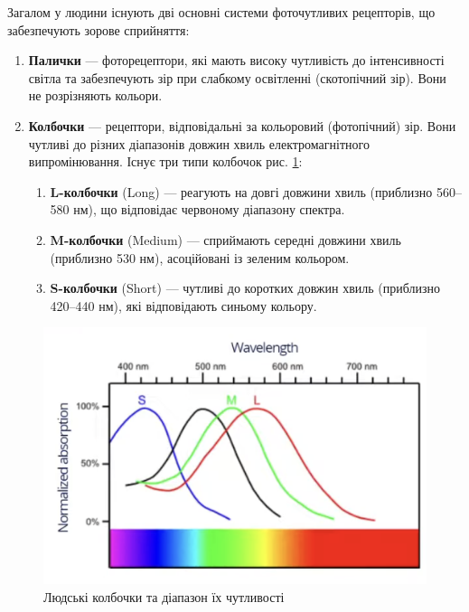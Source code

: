 \par
Загалом у людини існують дві основні системи фоточутливих рецепторів, що забезпечують зорове сприйняття:
\begin{enumerate}
\item \textbf{Палички} — фоторецептори, які мають високу чутливість до інтенсивності світла та забезпечують зір при слабкому освітленні 
(скотопічний зір). Вони не розрізняють кольори.
\item \textbf{Колбочки} — рецептори, відповідальні за кольоровий (фотопічний) зір. Вони чутливі до різних діапазонів довжин хвиль електромагнітного 
випромінювання. Існує три типи колбочок рис. \ref{fig:LightRecept}:
\begin{enumerate}
    \item \textbf{L-колбочки} (Long) — реагують на довгі довжини хвиль (приблизно 560–580 нм), що відповідає червоному діапазону спектра.
    \item \textbf{M-колбочки} (Medium) — сприймають середні довжини хвиль (приблизно 530 нм), асоційовані із зеленим кольором.
    \item \textbf{S-колбочки} (Short) — чутливі до коротких довжин хвиль (приблизно 420–440 нм), які відповідають синьому кольору.
\end{enumerate}
\end{enumerate}

 \begin{figure}[h]
  \centering
  \includegraphics[scale=1]{Pictures/LightRecept.png}
  \caption{Людські колбочки та діапазон їх чутливості}
  \label{fig:LightRecept}
\end{figure}


